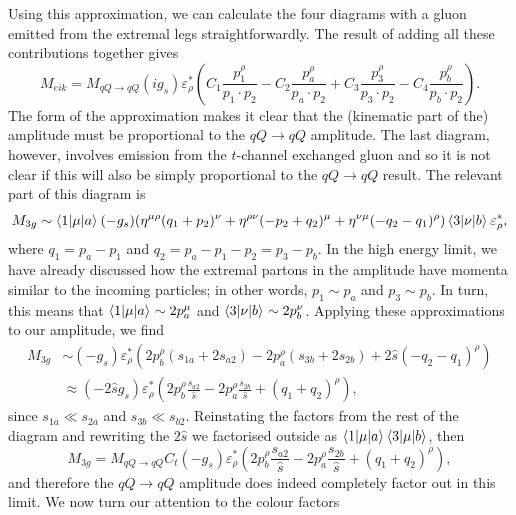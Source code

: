 Using this approximation, we can calculate the four diagrams with a gluon emitted from the extremal legs straightforwardly. The result of adding all these contributions together gives
\begin{equation}
M_{eik} = M_{qQ \to qQ} (i g_s) \varepsilon_\rho^* \left(C_1\frac{p_1^\rho}{p_1 \cdot p_2} - C_2\frac{p_a^\rho}{p_a \cdot p_2} + C_3\frac{p_3^\rho}{p_3 \cdot p_2} - C_4\frac{p_b^\rho}{p_b \cdot p_2}  \right).
\end{equation}
The form of the approximation makes it clear that the (kinematic part of the) amplitude must be proportional to the $qQ \to qQ$ amplitude. The last diagram, however, involves emission from the $t$-channel exchanged gluon and so it is not clear if this will also be simply proportional to the $qQ \to qQ$ result. The relevant part of this diagram is
\begin{equation}
M_{3g} \sim \mathinner{\langle1\vert\mu\vert a\rangle}_{} (- g_s)(\eta^{\mu \rho}(q_1 + p_2)^\nu + \eta^{\rho \nu}(-p_2 + q_2)^\mu + \eta^{\nu \mu}(-q_2 - q_1)^\rho) \mathinner{\langle3\vert\nu\vert b\rangle}_{} \varepsilon^*_\rho,
\end{equation}
where $q_1 = p_a - p_1$ and $q_2 = p_a - p_1 -p_2 = p_3 - p_b$. In the high energy limit, we have already discussed how the extremal partons in the amplitude have momenta similar to the incoming particles; in other words, $p_1 \sim p_a$ and $p_3 \sim p_b$. In turn, this means that $\mathinner{\langle1\vert\mu\vert a\rangle}_{} \sim 2p_a^\mu$ and $\mathinner{\langle3\vert\nu\vert b\rangle}_{} \sim 2p_b^\nu$. Applying these approximations to our amplitude, we find 
\begin{equation}
\begin{split}
M_{3g} &\sim (- g_s)\varepsilon_\rho^*(2p_b^\rho(s_{1a} + 2 s_{a2}) - 2 p_a^\rho (s_{3b} + 2 s_{2b}) + 2 \hat{s} (-q_2 - q_1)^\rho) \\
& \approx (- 2 \hat{s}  g_s)\varepsilon_\rho^*  \left (2p_b^\rho \frac{s_{a2}}{\hat{s}} - 2 p_a^\rho \frac{s_{2b}}{\hat{s}} + (q_1 + q_2)^\rho \right),
\end{split}
\end{equation}
since $s_{1a} \ll s_{2a}$ and $s_{3b} \ll s_{b2}$. Reinstating the factors from the rest of the diagram and rewriting the $2 \hat{s}$ we factorised outside as $\mathinner{\langle1\vert\mu\vert a\rangle}_{} \mathinner{\langle3\vert\mu\vert b\rangle}_{}$, then
\begin{equation}
M_{3g} = M_{qQ \to qQ} C_t(-g_s)\varepsilon_\rho^*  \left (2p_b^\rho \frac{s_{a2}}{\hat{s}} - 2 p_a^\rho \frac{s_{2b}}{\hat{s}} + (q_1 + q_2)^\rho \right),
\end{equation}
and therefore the $qQ \to qQ$ amplitude does indeed completely factor out in this limit. We now turn our attention to the colour factors
